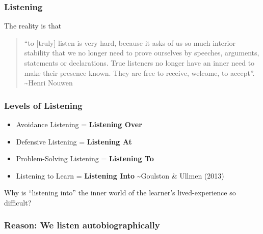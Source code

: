 \documentclass[
]{book}
\providecommand{\tightlist}{%
  \setlength{\itemsep}{0pt}\setlength{\parskip}{0pt}}
\begin{document}
\hypertarget{listening}{%
\subsubsection*{Listening}\label{listening}}

The reality is that

\begin{quote}
``to {[}truly{]} listen is very hard, because it asks of us so much interior stability that we no longer need to prove ourselves by speeches, arguments, statements or declarations. True listeners no longer have an inner need to make their presence known. They are free to receive, welcome, to accept''.
\textasciitilde Henri Nouwen
\end{quote}

\hypertarget{levels-of-listening}{%
\subsubsection*{Levels of Listening}\label{levels-of-listening}}

\begin{itemize}
\tightlist
\item
  Avoidance Listening = \textbf{Listening Over}
\item
  Defensive Listening = \textbf{Listening At}
\item
  Problem-Solving Listening = \textbf{Listening To}
\item
  Listening to Learn = \textbf{Listening Into}
  \textasciitilde Goulston \& Ullmen (2013)
\end{itemize}

\begin{reflect}
Why is ``listening into'' the inner world of the learner's lived-experience so difficult?
\end{reflect}

\hypertarget{reason-we-listen-autobiographically}{%
\subsubsection*{Reason: We listen autobiographically}\label{reason-we-listen-autobiographically}}
\end{document}
